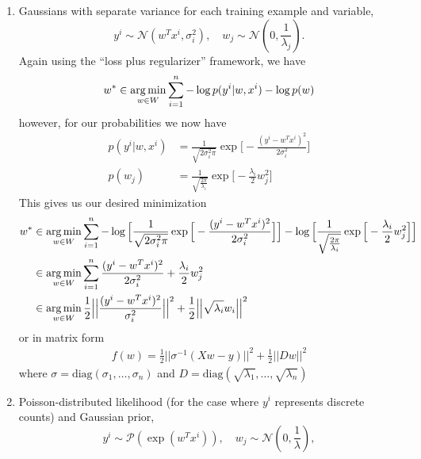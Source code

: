 \begin{enumerate}
	\item Gaussians with separate variance for each training example and variable,
	$$y^i \sim \mathcal{N}(w^Tx^i,\sigma_i^2), \quad w_j \sim \mathcal{N}\left(0,\frac{1}{\lambda_j}\right).$$
	Again using the ``loss plus regularizer'' framework, we have
	\begin{align*}
		w^* \in \mathop{\rm arg\,min}_{w \in W} \sum_{i=1}^n -\log p(y^i | w, x^i) - \log p(w)
	\end{align*}
	however, for our probabilities we now have
	\begin{align*}
		p(y^i | w, x^i) & = \frac{1}{\sqrt{2\sigma_i^2 \pi}} \exp \Big[- \frac{(y^i - w^Tx^i)^2}{2 \sigma_i^2}\Big] \\
		p(w_j) & = \frac{1}{\sqrt{\frac{2\pi}{\lambda_i}}} \exp \Big[- \frac{\lambda_i}{2} w_j^2\Big]
	\end{align*}
	This gives us our desired minimization
	\begin{align*}
		w^* & \in \mathop{\rm arg\,min}_{w \in W} \sum_{i=1}^n -\log \Big[\frac{1}{\sqrt{2\sigma_i^2 \pi}} \exp \Big[- \frac{(y^i - w^Tx^i)^2}{2 \sigma_i^2}\Big] \Big] - \log \Big[\frac{1}{\sqrt{\frac{2\pi}{\lambda_i}}} \exp \Big[- \frac{\lambda_i}{2} w_j^2\Big] \Big] \\
		& \in \mathop{\rm arg\,min}_{w \in W} \sum_{i=1}^n \frac{(y^i - w^Tx^i)^2}{2 \sigma_i^2} + \frac{\lambda_i}{2} w_j^2  \\
		& \in \mathop{\rm arg\,min}_{w \in W} \frac{1}{2} \Big| \Big| \frac{(y^i - w^Tx^i)^2}{\sigma_i^2} \Big| \Big| ^2 + \frac{1}{2} \Big| \Big| \sqrt{\lambda_i} w_i \Big| \Big| ^2
	\end{align*}
	or in matrix form
	\begin{align*}
		f(w) = \frac{1}{2} ||\sigma^{-1}(Xw-y)||^2 + \frac{1}{2} ||Dw||^2
	\end{align*}	
	where $\sigma = \text{diag}(\sigma_1, \ldots, \sigma_n)$ and $D = \text{diag}(\sqrt{\lambda_1}, \ldots, \sqrt{\lambda_n})$
	
	
	\item Poisson-distributed likelihood (for the case where $y^i$ represents discrete counts) and Gaussian prior,
	$$y^i \sim \mathcal{P}(\exp(w^Tx^i)), \quad w_j \sim \mathcal{N}\left(0,\frac{1}{\lambda}\right),$$
	

\end{enumerate}
